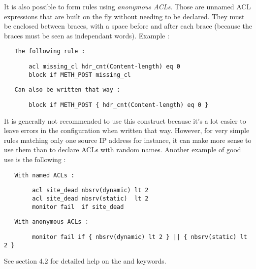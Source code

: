 It is also possible to form rules using \emph{anonymous ACLs}. Those are unnamed ACL
expressions that are built on the fly without needing to be declared. They must
be enclosed between braces, with a space before and after each brace (because
the braces must be seen as independant words). Example :

\begin{verbatim}
   The following rule :
\end{verbatim}

\begin{verbatim}
       acl missing_cl hdr_cnt(Content-length) eq 0
       block if METH_POST missing_cl
\end{verbatim}

\begin{verbatim}
   Can also be written that way :
\end{verbatim}

\begin{verbatim}
       block if METH_POST { hdr_cnt(Content-length) eq 0 }
\end{verbatim}


It is generally not recommended to use this construct because it's a lot easier
to leave errors in the configuration when written that way. However, for very
simple rules matching only one source IP address for instance, it can make more
sense to use them than to declare ACLs with random names. Another example of
good use is the following :

\begin{verbatim}
   With named ACLs :
\end{verbatim}

\begin{verbatim}
        acl site_dead nbsrv(dynamic) lt 2
        acl site_dead nbsrv(static)  lt 2
        monitor fail  if site_dead
\end{verbatim}

\begin{verbatim}
   With anonymous ACLs :
\end{verbatim}

\begin{verbatim}
        monitor fail if { nbsrv(dynamic) lt 2 } || { nbsrv(static) lt 2 }
\end{verbatim}


See section 4.2 for detailed help on the  and  keywords.

